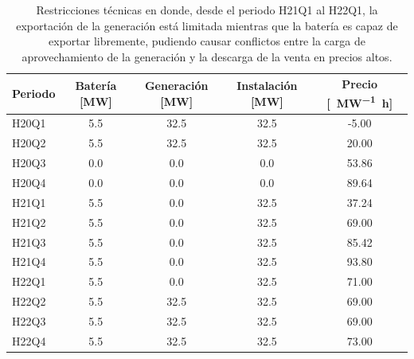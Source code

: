 \begin{table}[ht]
  \centering
  \begin{tabular}{|l|S|S|S|S|}
    \hline
    Periodo & {Batería [\si{\mega\watt}]}  & {Generación [\si{\mega\watt}]}  & {Instalación [\si{\mega\watt}]}  & {Precio [\si{\text{\euro}\per\mega\watt\hour}]} \\
    \hline
    H20Q1   & 5.5                          & 32.5                            & 32.5                             & -5.00                                           \\
    H20Q2   & 5.5                          & 32.5                            & 32.5                             & 20.00                                           \\
    H20Q3   & 0.0                          &  0.0                            &  0.0                             & 53.86                                           \\
    H20Q4   & 0.0                          &  0.0                            &  0.0                             & 89.64                                           \\
    H21Q1   & 5.5                          &  0.0                            & 32.5                             & 37.24                                           \\
    H21Q2   & 5.5                          &  0.0                            & 32.5                             & 69.00                                           \\
    H21Q3   & 5.5                          &  0.0                            & 32.5                             & 85.42                                           \\
    H21Q4   & 5.5                          &  0.0                            & 32.5                             & 93.80                                           \\
    H22Q1   & 5.5                          &  0.0                            & 32.5                             & 71.00                                           \\
    H22Q2   & 5.5                          & 32.5                            & 32.5                             & 69.00                                           \\
    H22Q3   & 5.5                          & 32.5                            & 32.5                             & 69.00                                           \\
    H22Q4   & 5.5                          & 32.5                            & 32.5                             & 73.00                                           \\
    \hline
  \end{tabular}
  \caption{Restricciones técnicas en donde, desde el periodo H21Q1 al H22Q1, la exportación de la generación está limitada mientras que la batería es capaz de exportar libremente, pudiendo causar conflictos entre la carga de aprovechamiento de la generación y la descarga de la venta en precios altos.}
  \label{tab:carga-descarga-simultanea}
\end{table}

